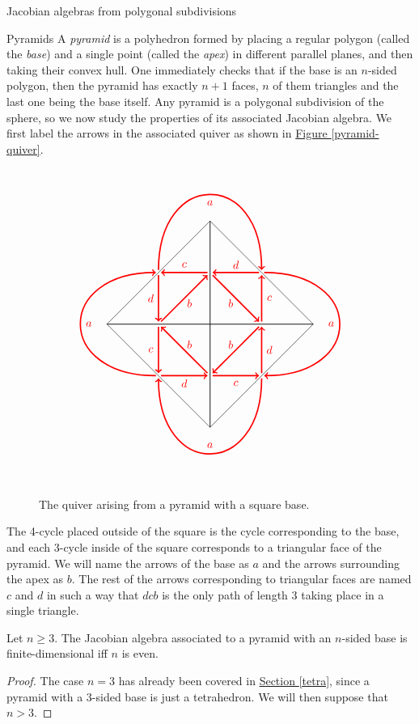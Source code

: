 \begin{chapter}{Jacobian algebras from polygonal subdivisions}
\begin{section}{Pyramids}
\label{pyramids}
A \emph{pyramid} is a polyhedron formed by placing a regular polygon (called the \emph{base}) and a single point (called the \emph{apex}) in different parallel planes, and then taking their convex hull. One immediately checks that if the base is an $n$-sided polygon, then the pyramid has exactly $n+1$ faces, $n$ of them triangles and the last one being the base itself.
Any pyramid is a polygonal subdivision of the sphere, so we now study the properties of its associated Jacobian algebra. We first label the arrows in the associated quiver as shown in 
\hyperref[pyramid-quiver]{Figure \ref*{pyramid-quiver}}.

\begin{figure}[h]
\label{pyramid-quiver}
\[
\begin{tikzpicture}[scale=0.8]
\foreach \x in {0,90,...,270}
{
\begin{scope}[rotate=\x]
\draw (0,0) -- (4,0);
\draw (0,0) -- (0,-4);
\draw (4,0) -- (0,-4);
\node at (0.8,-0.8) {\textcolor{red}{$b$}};
\node at (1,-2.3) {\textcolor{red}{$c$}};
\node at (2.3,-1) {\textcolor{red}{$d$}};
\node at (0,-4.7) {\textcolor{red}{$a$}};
\draw [<-, red, very thick] (0.1, -1.9) to (1.9, -0.1);
\draw [<-, red, very thick] (2, -0.1) to  (2, -1.9);
\draw [<-, red, very thick] (1.9, -2) to  (0.1, -2);
\draw [<-, red, very thick] (-2, -2.1) to [bend right=90, looseness=2.5] (2, -2.1);
\end{scope}
}
\end{tikzpicture}
\]
\caption{The quiver arising from a pyramid with a square base.}
\label{pyramid}
\end{figure}

The 4-cycle placed outside of the square is the cycle corresponding to the base, and each 3-cycle inside of the square corresponds to a triangular face of the pyramid. We will name the arrows of the base as $a$ and the arrows surrounding the apex as $b$. The rest of the arrows corresponding to triangular faces are named $c$ and $d$ in such a way that $dcb$ is the only path of length 3 taking place in a single triangle.

\begin{thm} Let $n\geq 3$. The Jacobian algebra associated to a pyramid with an $n$-sided base is finite-dimensional iff $n$ is even.
\end{thm}
\begin{proof} The case $n=3$ has already been covered in \hyperref[tetra]{Section \ref*{tetra}}, since a pyramid with a 3-sided base is just a tetrahedron. We will then suppose that $n> 3$.


\end{proof}
\end{section}
\end{chapter}

